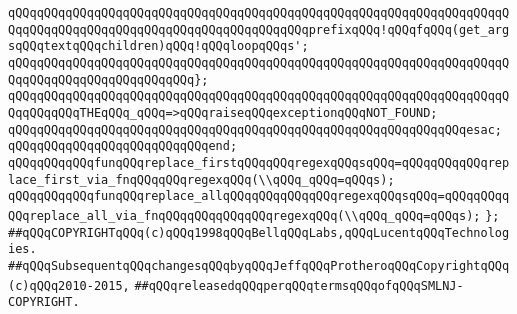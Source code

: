 \newline
\verb|qQQqqQQqqQQqqQQqqQQqqQQqqQQqqQQqqQQqqQQqqQQqqQQqqQQqqQQqqQQqqQQqqQQqqQQqqQQqqQQqqQQqqQQqqQQqqQQqqQQqqQQqqQQqqQQqprefixqQQq!qQQqfqQQq(get_argsqQQqtextqQQqchildren)qQQq!qQQqloopqQQqs';|\newline
\verb|qQQqqQQqqQQqqQQqqQQqqQQqqQQqqQQqqQQqqQQqqQQqqQQqqQQqqQQqqQQqqQQqqQQqqQQqqQQqqQQqqQQqqQQqqQQqqQQq};|\newline
\newline
\verb|qQQqqQQqqQQqqQQqqQQqqQQqqQQqqQQqqQQqqQQqqQQqqQQqqQQqqQQqqQQqqQQqqQQqqQQqqQQqqQQqTHEqQQq_qQQq=>qQQqraiseqQQqexceptionqQQqNOT_FOUND;|\newline
\verb|qQQqqQQqqQQqqQQqqQQqqQQqqQQqqQQqqQQqqQQqqQQqqQQqqQQqqQQqqQQqqQQqesac;|\newline
\newline
\verb|qQQqqQQqqQQqqQQqqQQqqQQqqQQqend;|\newline
\newline
\newline
\verb|qQQqqQQqqQQqfunqQQqreplace_firstqQQqqQQqregexqQQqsqQQq=qQQqqQQqqQQqreplace_first_via_fnqQQqqQQqregexqQQq(\\qQQq_qQQq=qQQqs);|\newline
\verb|qQQqqQQqqQQqfunqQQqreplace_allqQQqqQQqqQQqqQQqregexqQQqsqQQq=qQQqqQQqqQQqreplace_all_via_fnqQQqqQQqqQQqqQQqregexqQQq(\\qQQq_qQQq=qQQqs);|\newline
\newline
\verb|};|\newline
\newline
\newline
\verb|##qQQqCOPYRIGHTqQQq(c)qQQq1998qQQqBellqQQqLabs,qQQqLucentqQQqTechnologies.|\newline
\verb|##qQQqSubsequentqQQqchangesqQQqbyqQQqJeffqQQqProtheroqQQqCopyrightqQQq(c)qQQq2010-2015,|\newline
\verb|##qQQqreleasedqQQqperqQQqtermsqQQqofqQQqSMLNJ-COPYRIGHT.|\newline

